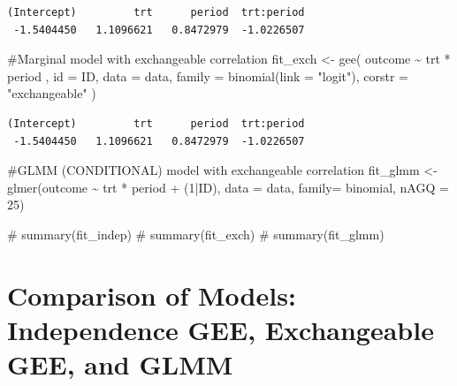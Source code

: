 \documentclass[
  letterpaper,
  DIV=11,
  numbers=noendperiod]{scrreprt}
\newenvironment{Shaded}{\begin{snugshade}}{\end{snugshade}}
\newcommand{\AttributeTok}[1]{\textcolor[rgb]{0.40,0.45,0.13}{#1}}
\newcommand{\CommentTok}[1]{\textcolor[rgb]{0.37,0.37,0.37}{#1}}
\newcommand{\DecValTok}[1]{\textcolor[rgb]{0.68,0.00,0.00}{#1}}
\newcommand{\FunctionTok}[1]{\textcolor[rgb]{0.28,0.35,0.67}{#1}}
\newcommand{\NormalTok}[1]{\textcolor[rgb]{0.00,0.23,0.31}{#1}}
\newcommand{\OtherTok}[1]{\textcolor[rgb]{0.00,0.23,0.31}{#1}}
\newcommand{\SpecialCharTok}[1]{\textcolor[rgb]{0.37,0.37,0.37}{#1}}
\newcommand{\StringTok}[1]{\textcolor[rgb]{0.13,0.47,0.30}{#1}}
\begin{document}
\begin{verbatim}
(Intercept)         trt      period  trt:period 
 -1.5404450   1.1096621   0.8472979  -1.0226507 
\end{verbatim}

\begin{Shaded}
\begin{Highlighting}[]
\CommentTok{\#Marginal model with exchangeable correlation}
\NormalTok{fit\_exch }\OtherTok{\textless{}{-}} \FunctionTok{gee}\NormalTok{(}
\NormalTok{  outcome }\SpecialCharTok{\textasciitilde{}}\NormalTok{ trt }\SpecialCharTok{*}\NormalTok{ period ,}
  \AttributeTok{id =}\NormalTok{ ID, }\AttributeTok{data =}\NormalTok{ data,}
  \AttributeTok{family =} \FunctionTok{binomial}\NormalTok{(}\AttributeTok{link =} \StringTok{"logit"}\NormalTok{),}
  \AttributeTok{corstr =} \StringTok{"exchangeable"}
\NormalTok{)}
\end{Highlighting}
\end{Shaded}

\begin{verbatim}
(Intercept)         trt      period  trt:period 
 -1.5404450   1.1096621   0.8472979  -1.0226507 
\end{verbatim}

\begin{Shaded}
\begin{Highlighting}[]
\CommentTok{\#GLMM (CONDITIONAL) model with exchangeable correlation}
\NormalTok{fit\_glmm }\OtherTok{\textless{}{-}} \FunctionTok{glmer}\NormalTok{(outcome }\SpecialCharTok{\textasciitilde{}}\NormalTok{ trt }\SpecialCharTok{*}\NormalTok{ period }\SpecialCharTok{+}\NormalTok{ (}\DecValTok{1}\SpecialCharTok{|}\NormalTok{ID),}
                  \AttributeTok{data =}\NormalTok{ data, }\AttributeTok{family=}\NormalTok{ binomial, }\AttributeTok{nAGQ =} \DecValTok{25}\NormalTok{)}




\CommentTok{\# summary(fit\_indep)}
\CommentTok{\# summary(fit\_exch)}
\CommentTok{\# summary(fit\_glmm)}
\end{Highlighting}
\end{Shaded}

\hypertarget{comparison-of-models-independence-gee-exchangeable-gee-and-glmm}{%
\section*{Comparison of Models: Independence GEE, Exchangeable GEE, and
GLMM}\label{comparison-of-models-independence-gee-exchangeable-gee-and-glmm}}
\end{document}
